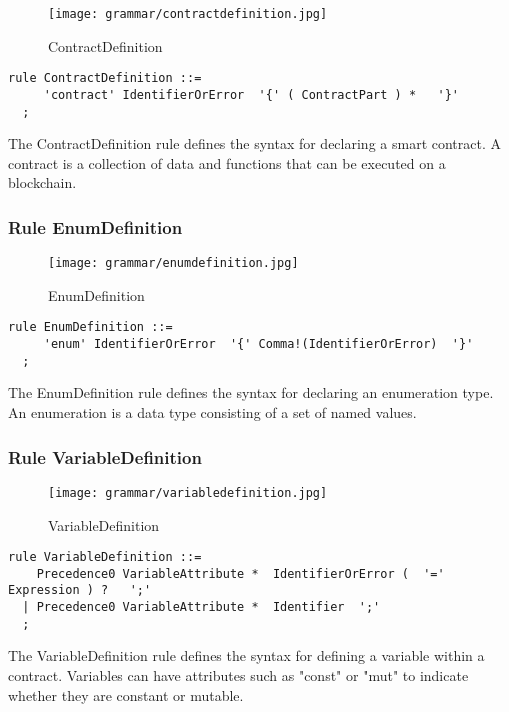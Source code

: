 \begin{figure}[!ht]
\centering
\texttt{[image: grammar/contractdefinition.jpg]}
\caption{ContractDefinition}
\end{figure}

\begin{lstlisting}
rule ContractDefinition ::=
     'contract' IdentifierOrError  '{' ( ContractPart ) *   '}' 
  ;
\end{lstlisting}

The ContractDefinition rule defines the syntax for declaring a smart contract. A contract is a collection of data and functions that can be executed on a blockchain.

\subsubsection*{Rule EnumDefinition}

\begin{figure}[!ht]
\centering
\texttt{[image: grammar/enumdefinition.jpg]}
\caption{EnumDefinition}
\end{figure}

\begin{lstlisting}
rule EnumDefinition ::=
     'enum' IdentifierOrError  '{' Comma!(IdentifierOrError)  '}' 
  ;
\end{lstlisting}

The EnumDefinition rule defines the syntax for declaring an enumeration type. An enumeration is a data type consisting of a set of named values.

\subsubsection*{Rule VariableDefinition}

\begin{figure}[!ht]
\centering
\texttt{[image: grammar/variabledefinition.jpg]}
\caption{VariableDefinition}
\end{figure}

\begin{lstlisting}
rule VariableDefinition ::=
    Precedence0 VariableAttribute *  IdentifierOrError (  '=' Expression ) ?   ';' 
  | Precedence0 VariableAttribute *  Identifier  ';' 
  ;
\end{lstlisting}

The VariableDefinition rule defines the syntax for defining a variable within a contract. Variables can have attributes such as "const" or "mut" to indicate whether they are constant or mutable.

